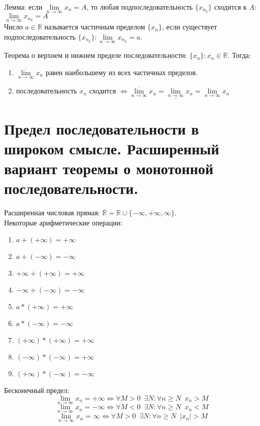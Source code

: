 \documentclass[11pt, a4paper, utf-8]{article}
\def\R{\mathbb{R}}
\def\sp{\, \, \,}
\def\linf{\lim \limits_{n \to \infty}}
\begin{document}
    Лемма: если $\linf x_n = A$, то любая подпоследовательность $\{x_{n_k}\}$ сходится к $A$: $\linf x_{n_k} = A$\\
    
    Число $a \in \R$ называется частичным пределом $\{x_n\}$, если существует подпоследовательность $\{x_{n_k}\}: \linf x_{n_k} = a$.
    
    Теорема о верхнем и нижнем пределе последовательности: $\{x_n\}: x_n \in \R$. Тогда:
    \begin{enumerate}
        \item $\overline{\linf} x_n$ равен наибольшему из всех частичных пределов.
        \item последовательность $x_n$ сходится $\iff \overline{\linf} x_n = \underline{\linf} x_n = \linf x_n$
    \end{enumerate}

    \section{Предел последовательности в широком смысле. Расширенный вариант теоремы о монотонной последовательности.}
    Расширенная числовая прямая: $\overline{\R} = \R \cup \{-\infty, +\infty, \infty\}$.\\
    Некоторые арифметические операции:
    \begin{enumerate}
        \item $a + (+\infty) = +\infty$
        \item $a + (-\infty) = -\infty$
        \item $+\infty + (+\infty) = +\infty$
        \item $-\infty + (-\infty) = -\infty$
        \item $a * (+\infty) = +\infty$
        \item $a * (-\infty) = -\infty$
        \item $(+\infty)*(+\infty) = +\infty$
        \item $(-\infty)*(-\infty) = +\infty$
        \item $(+\infty)*(-\infty) = -\infty$
    \end{enumerate}

    Бесконечный предел:
    $$\linf x_n = +\infty \iff \forall M > 0 \sp \exists N: \forall n \geq N \sp x_n > M$$
    $$\linf x_n = -\infty \iff \forall M < 0 \sp \exists N: \forall n \geq N \sp x_n < M$$
    $$\linf x_n = \infty \iff \forall M > 0 \sp \exists N: \forall n \geq N \sp |x_n| > M$$
\end{document}
